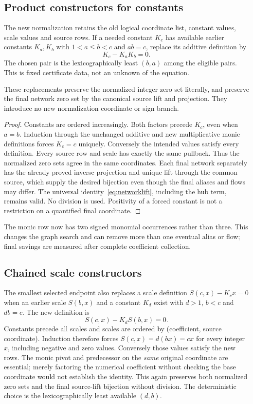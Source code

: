 \subsection{Product constructors for constants}
The new normalization retains the old logical coordinate list, constant
values, scale values and source rows. If a needed constant $K_c$ has
available earlier constants $K_a,K_b$ with $1<a\le b<c$ and $ab=c$,
replace its additive definition by
\[
 K_c-K_aK_b=0.
\]
The chosen pair is the lexicographically least $(b,a)$ among the eligible
pairs. This is fixed certificate data, not an unknown of the equation.

\begin{proposition}
These replacements preserve the normalized integer zero set literally,
and preserve the final network zero set by the canonical source lift and
projection. They introduce no new normalization coordinate or sign branch.
\end{proposition}
\begin{proof}
Constants are ordered increasingly. Both factors precede $K_c$, even when
$a=b$. Induction through the unchanged additive and new multiplicative
monic definitions forces $K_c=c$ uniquely. Conversely the intended values
satisfy every definition. Every source row and scale has exactly the same
pullback. Thus the normalized zero sets agree in the same coordinates.
Each final network separately has the already proved inverse projection
and unique lift through the common source, which supply the desired
bijection even though the final aliases and flows may differ. The universal
identity~\eqref{eq:networklift}, including the hub term, remains valid.
No division is used. Positivity of a forced constant is not a restriction
on a quantified final coordinate.
\end{proof}
The monic row now has two signed monomial occurrences rather than three.
This changes the graph search and can remove more than one eventual alias
or flow; final savings are measured after complete coefficient collection.

\subsection{Chained scale constructors}
The smallest selected endpoint also replaces a scale definition
$S(c,x)-K_cx=0$ when an earlier scale $S(b,x)$ and a constant $K_d$
exist with $d>1$, $b<c$ and $db=c$. The new definition is
\[
 S(c,x)-K_dS(b,x)=0.
\]
Constants precede all scales and scales are ordered by
(coefficient, source coordinate). Induction therefore forces
$S(c,x)=d(bx)=cx$ for every integer $x$, including negative and zero
values. Conversely those values satisfy the new rows. The monic pivot
and predecessor on the \emph{same} original coordinate are essential;
merely factoring the numerical coefficient without checking the base
coordinate would not establish the identity. This again preserves both
normalized zero sets and the final source-lift bijection without division.
The deterministic choice is the lexicographically least available $(d,b)$.

